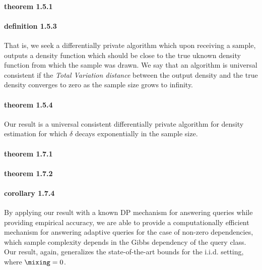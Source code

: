 \documentclass{article}
\begin{document}
\paragraph{theorem 1.5.1}

\paragraph{definition 1.5.3}
That is, we seek a differentially private algorithm which upon receiving a sample,
outputs a density function which should be close to the true uknown density function
from which the sample was drawn.
We say that an algorithm is universal consistent if the \emph{Total Variation distance}
between the output density and the true density converges to zero as the sample size grows to infinity.

\paragraph{theorem 1.5.4}
Our result is a universal consistent differentially private algorithm for density estimation 
for which $\delta$ decays exponentially in the sample size. 

\paragraph{theorem 1.7.1}

\paragraph{theorem 1.7.2}

\paragraph{corollary 1.7.4}
By applying our result with a known DP mechanism for answering queries while providing empirical accuracy, 
we are able to provide a computationally efficient mechanism for answering adaptive queries for the case of non-zero dependencies,
which sample complexity depends in the Gibbs dependency of the query class. 
Our result, again, generalizes the state-of-the-art bounds for the i.i.d. setting, where $\mixing = 0$.
\end{document}
